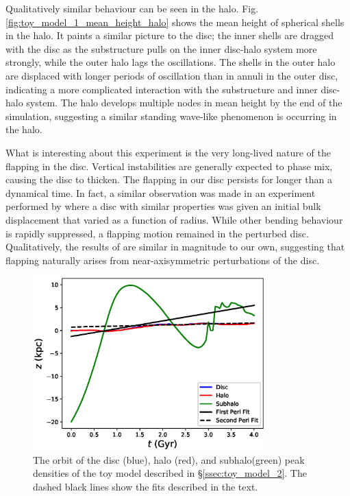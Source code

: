 Qualitatively similar behaviour can be seen in the halo. Fig. \ref{fig:toy_model_1_mean_height_halo} shows the mean height of spherical shells in the halo. It paints a similar picture to the disc; the inner shells are dragged with the disc as the substructure pulls on the inner disc-halo system more strongly, while the outer halo lags the oscillations. The shells in the outer halo are displaced with longer periods of oscillation than in annuli in the outer disc, indicating a more complicated interaction with the substructure and inner disc-halo system. The halo develops multiple nodes in mean height by the end of the simulation, suggesting a similar standing wave-like phenomenon is occurring in the halo.

What is interesting about this experiment is the very long-lived nature of the flapping in the disc. Vertical instabilities are generally expected to phase mix, causing the disc to thicken. The flapping in our disc persists for longer than a dynamical time. In fact, a similar observation was made in an experiment performed by \citet{sellwood_1996} where a disc with similar properties was given an initial bulk displacement that varied as a function of radius. While other bending behaviour is rapidly suppressed, a flapping motion remained in the perturbed disc. Qualitatively, the results of \citet{sellwood_1996} are similar in magnitude to our own, suggesting that flapping naturally arises from near-axisymmetric perturbations of the disc.

\begin{figure}
	\centering
	\includegraphics[width=0.8\textwidth]{../figures/isolated_orbits_two_fits.eps}
	\caption{The orbit of the disc (blue), halo (red), and subhalo(green) peak densities of the toy model described in \S\ref{ssec:toy_model_2}. The dashed black lines show the fits described in the text.} \label{fig:toy_model_2_orbits}
\end{figure}



